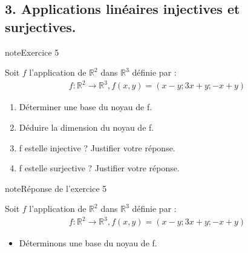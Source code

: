 \documentclass[letterpaper,10pt,french]{jupyterBook}
\begin{document}
\subsection{3. Applications linéaires injectives et surjectives.}
\label{\detokenize{S_xe9rie2:applications-lineaires-injectives-et-surjectives}}
\begin{sphinxadmonition}{note}{Exercice 5}

\sphinxAtStartPar
Soit \(f\) l’application de \(\mathbb{R}^2\) dans \(\mathbb{R}^3\) définie par :
\begin{equation*}
\begin{split}
f : \mathbb{R}^2 \rightarrow \mathbb{R}^3, f(x, y) = (x - y; 3x + y; -x + y )
\end{split}
\end{equation*}\begin{enumerate}
%
\item {} 
\sphinxAtStartPar
Déterminer une base du noyau de f.

\item {} 
\sphinxAtStartPar
Déduire la dimension du noyau de f.

\item {} 
\sphinxAtStartPar
f est\sphinxhyphen{}elle injective ? Justifier votre réponse.

\item {} 
\sphinxAtStartPar
f est\sphinxhyphen{}elle surjective ? Justifier votre réponse.

\end{enumerate}
\end{sphinxadmonition}

\begin{sphinxadmonition}{note}{Réponse de l’exercice 5}

\sphinxAtStartPar
Soit \(f\) l’application de \(\mathbb{R}^2\) dans \(\mathbb{R}^3\) définie par :
\begin{equation*}
\begin{split}
f : \mathbb{R}^2 \rightarrow \mathbb{R}^3, f(x, y) = (x - y; 3x + y; -x + y )
\end{split}
\end{equation*}\begin{itemize}
\item {} 
\sphinxAtStartPar
Déterminons une base du noyau de f.

\end{itemize}
\end{sphinxadmonition}
\end{document}
